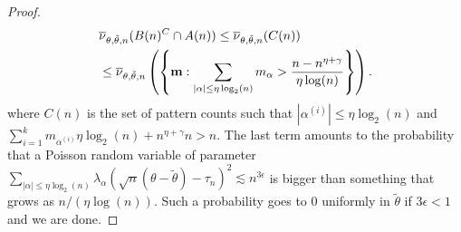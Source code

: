 \documentclass[10pt,a4paper]{amsart}
\begin{document}
\begin{proof}
\[\begin{split}
&\overline{\nu}_{\theta, \tilde{\theta},n}(B(n)^C \cap A(n)) \leq \overline{\nu}_{\theta, \tilde{\theta},n}(C(n))
\\
&\leq \overline{\nu}_{\theta, \tilde{\theta},n}\left ( \left\{ {\bf m}:\sum_{|\alpha| \leq \eta\log_2(n)}m_{\alpha} > \frac{n-n^{\eta+ \gamma}}{\eta \log(n)} \right\}\right ).
\end{split}\]
where $C(n)$ is the set of pattern counts such that $|\alpha^{(i)}| \leq \eta\log_2(n)$ and $\sum_{i=1}^{k}m_{\alpha^{(i)}}\eta \log_2(n)+n^{\eta +\gamma}n > n$.
The last term amounts to the probability that a Poisson random variable of parameter $\sum_{|\alpha| \leq \eta \log_2(n)}\lambda_\alpha (\sqrt{n}(\theta-\tilde{\theta})-\tau_n)^2 \lesssim n^{3\epsilon}$ is bigger than something that grows as
$
n/(\eta \log(n)).
$
Such a probability goes to $0$ uniformly in $\tilde{\theta}$ if $3\epsilon<1$ and we are done.

\end{proof}
\end{document}
